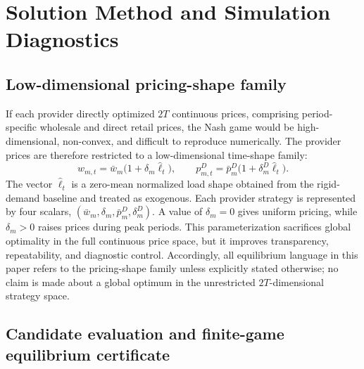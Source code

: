 \documentclass[11pt,a4paper]{article}
\begin{document}
\section{Solution Method and Simulation Diagnostics}
\label{sec:solver}

\subsection{Low-dimensional pricing-shape family}

If each provider directly optimized $2T$ continuous prices, comprising period-specific wholesale and direct retail prices, the Nash game would be high-dimensional, non-convex, and difficult to reproduce numerically. The provider prices are therefore restricted to a low-dimensional time-shape family:
\begin{equation}
  w_{m,t}=\bar w_m\big(1+\delta_m\widehat{\ell}_t\big),
  \qquad
  p^D_{m,t}=\bar p^D_m\big(1+\delta^D_m\widehat{\ell}_t\big).
  \label{eq:shape}
\end{equation}
The vector $\widehat{\ell}_t$ is a zero-mean normalized load shape obtained from the rigid-demand baseline and treated as exogenous. Each provider strategy is represented by four scalars, $(\bar w_m,\delta_m,\bar p^D_m,\delta^D_m)$. A value of $\delta_m=0$ gives uniform pricing, while $\delta_m>0$ raises prices during peak periods. This parameterization sacrifices global optimality in the full continuous price space, but it improves transparency, repeatability, and diagnostic control. Accordingly, all equilibrium language in this paper refers to the pricing-shape family unless explicitly stated otherwise; no claim is made about a global optimum in the unrestricted $2T$-dimensional strategy space.

\subsection{Candidate evaluation and finite-game equilibrium certificate}
\end{document}
